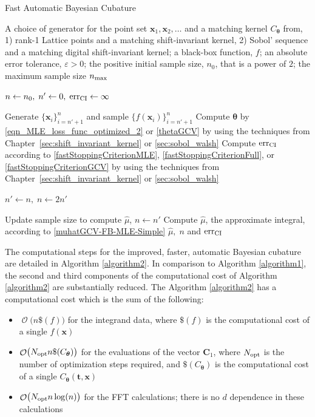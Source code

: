 \documentclass{iitthesis}          %
\DeclareMathOperator{\Order}{{\mathcal O}}
\newcommand{\bm}[1]{\boldsymbol{#1}}
\newcommand{\vtheta}{{\bm{\theta}}}
\newcommand{\vC}{\bm{C}}
\newcommand{\vt}{\bm{t}}
\newcommand{\vx}{\bm{x}}
\newcommand{\hmu}{\widehat{\mu}}
\newcommand{\opt}{\textup{opt}}
\newcommand{\err}{\textup{err}}
\begin{document}
\begin{algorithm}
	\caption{Fast Automatic Bayesian Cubature}\label{algorithm2}
	\begin{algorithmic}[1]
		\Require 
		A choice of generator for the point set $\vx_1, \vx_2, \ldots$ and a matching kernel $C_\vtheta$ from, 
		1) rank-1 Lattice points and a matching shift-invariant  kernel, 2) Sobol' sequence and a matching digital shift-invariant kernel;
		a black-box function, $f$; 
		an absolute error tolerance,
		$\varepsilon>0$; the positive initial sample size, $n_0$, that is a power of $2$;
		the maximum sample size $n_{\textup{max}}$
		
		\State $n \gets n_0, \; n' \gets 0, \; \err_{\textup{CI}} \gets \infty$
		
		\While{$\err_{\textup{CI}} > \varepsilon$ and $n \le n_{\textup{max}}$}
		
		\State\label{LoopStartA2}Generate $\{ \vx_i\}_{i=n' + 1}^{n}$ and sample $\{f(\vx_i)\}_{i=n'+1}^{n}$
		\State Compute $\vtheta$ by \eqref{eqn_MLE_loss_func_optimized_2} or \eqref{thetaGCV} by using the techniques from Chapter~\ref{sec:shift_invariant_kernel} or \ref{sec:sobol_walsh}
		\State Compute $\err_{\textup{CI}}$  according to \eqref{fastStoppingCriterionMLE}, \eqref{fastStoppingCriterionFull}, or \eqref{fastStoppingCriterionGCV}  by using the techniques from Chapter~\ref{sec:shift_invariant_kernel} or \ref{sec:sobol_walsh}
		
		\State	$n' \gets n, \; n \gets 2n'$
		
		\EndWhile
		
		\State Update sample size to compute $\hmu$, $n \gets n'$
		\State Compute $\hmu$, the approximate integral,   according to \eqref{muhatGCV-FB-MLE-Simple}
		\State \Return $\hmu, \; n$  and $\err_{\textup{CI}}$
	\end{algorithmic}
\end{algorithm}

The computational steps for the improved, faster, automatic Bayesian cubature are detailed in Algorithm \ref{algorithm2}.
In comparison to Algorithm \ref{algorithm1}, the second and third components of the computational cost of Algorithm  \ref{algorithm2} are substantially reduced.
The Algorithm \ref{algorithm2} has a computational cost which is the sum of the following:
\begin{itemize}
	\item $\Order\bigl(n\$(f) \bigr)$ for the integrand data, where $\$(f)$ is the computational cost of a single $f(\vx)$
	
	\item $\Order\bigl(N_{\opt} n \$(C_\vtheta) \bigr)$ for the evaluations of the vector $\vC_{1}$, where $N_\opt$ is the number of optimization steps required, and  $\$(C_\vtheta)$ is the computational cost of a single $C_\vtheta(\vt,\vx)$
	
	\item $\Order\bigl(N_{\opt} n \log(n) \bigr)$ for the FFT calculations; there is no $d$ dependence in these calculations
\end{itemize}
\end{document}
